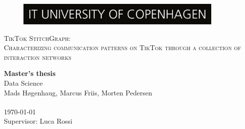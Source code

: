 \documentclass[
10pt, %
a4paper, %
oneside, %
headinclude,footinclude, %
] {book}%
\begin{document}
\hypersetup{pageanchor=false}
\begin{titlepage}
\thispagestyle{empty}
\begin{figure}[h!] %
\centering
\includegraphics[width=4in]{extra/ITUlogo.jpg} 
\end{figure}

\begin{center}
\vspace{30 mm}
\begingroup \linespread{1,75} \selectfont 




\textsc{\LARGE TikTok StitchGraph:}\\
\textsc{\Large Characterizing communication patterns on TikTok through a collection of interaction networks}




\endgroup


\end{center}
\vfill
\textbf{Master's thesis}\\  %
Data Science\\  
Mads Høgenhaug, Marcus Friis, Morten Pedersen\\
\\ 
\today\\
Supervisor: Luca Rossi
\end{titlepage}
\hypersetup{pageanchor=true}
\end{document}
